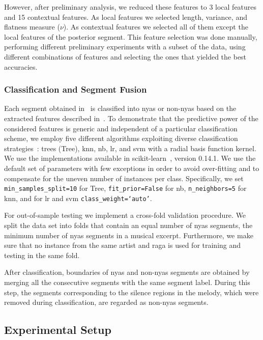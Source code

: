 {However, after preliminary analysis, we reduced these features to 3 local features and 15 contextual features. As local features we selected length, variance, and flatness measure ($\nu$). As contextual features we selected all of them except the local features of the posterior segment. This feature selection was done manually, performing different preliminary experiments with a subset of the data, using different combinations of features and selecting the ones that yielded the best accuracies.

\subsubsection{Classification and Segment Fusion}

Each segment obtained in~ is classified into \gls{nyas} or non-\gls{nyas} based on the extracted features described in~. To demonstrate that the predictive power of the considered features is generic and independent of a particular classification scheme, we employ five different algorithms exploiting diverse classification strategies~\citep{Hastie09BOOK}: trees (Tree), \gls{knn}, \gls{nb}, \gls{lr}, and \gls{svm} with a radial basis function kernel. We use the implementations available in scikit-learn~\citep{scikitlearn}, version 0.14.1. We use the default set of parameters with few exceptions in order to avoid over-fitting and to compensate for the uneven number of instances per class. Specifically, we set \texttt{min\_samples\_split=10} for Tree, \texttt{fit\_prior=False} for \gls{nb}, \texttt{n\_neighbors=5} for \gls{knn}, and for \gls{lr} and \gls{svm} \texttt{class\_weight=`auto'}.

For out-of-sample testing we implement a cross-fold validation procedure. We split the data set into folds that contain an equal number of \gls{nyas} segments, the minimum number of \gls{nyas} segments in a musical excerpt. Furthermore, we make sure that no instance from the same artist and \gls{raga} is used for training and testing in the same fold.

After classification, boundaries of \gls{nyas} and non-\gls{nyas} segments are obtained by merging all the consecutive segments with the same segment label. During this step, the segments corresponding to the silence regions in the melody, which were removed during classification, are regarded as non-\gls{nyas} segments.

\subsection{Experimental Setup}
\label{sec:pre_processing_nyas_segmentation_experimental_setup}

}
